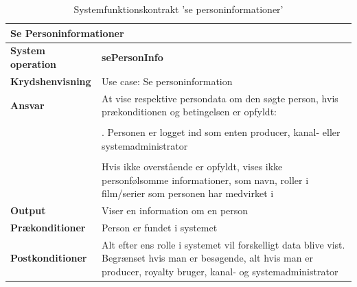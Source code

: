 \begin{table}[H]
    \begin{tabularx}{\textwidth}{|p{4cm}|X|}
        \hline
        \multicolumn{2}{|X|}{\textbf{Se Personinformationer}}\\
        \hline
        \textbf{System operation}       & \textbf{sePersonInfo} \\ \hline
        \textbf{Krydshenvisning}        & Use case: Se personinformation \\ \hline
        \textbf{Ansvar}                 & At vise respektive persondata om den søgte person, hvis prækonditionen og betingelsen er opfyldt:\\
                                        & \\
                                        & \quad 1. Personen er logget ind som enten producer, kanal- eller systemadministrator\\
                                        & \\
                                        & Hvis ikke overstående er opfyldt, vises ikke personfølsomme informationer, som navn, roller i film/serier som personen har medvirket i\\ \hline
        \textbf{Output}                 & Viser en information om en person \\ \hline
        \textbf{Prækonditioner}         & Person er fundet i systemet \\ \hline
        \textbf{Postkonditioner}        & Alt efter ens rolle i systemet vil forskelligt data blive vist. Begrænset hvis man er besøgende, alt hvis man er producer, royalty bruger, kanal- og systemadministrator \\ \hline
    \end{tabularx}
    \caption{Systemfunktionskontrakt 'se personinformationer'}
    \label{tab:kontrakter_se_personinformationer}
\end{table}

